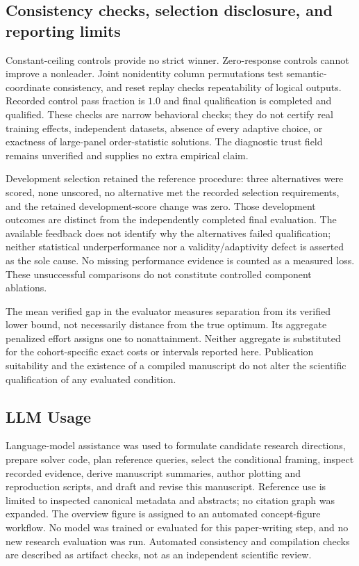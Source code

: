 \documentclass{article}
\begin{document}
\subsection{Consistency checks, selection disclosure, and reporting limits}
Constant-ceiling controls provide no strict winner. Zero-response controls cannot improve a nonleader. Joint nonidentity column permutations test semantic-coordinate consistency, and reset replay checks repeatability of logical outputs. Recorded control pass fraction is $1.0$ and final qualification is completed and qualified. These checks are narrow behavioral checks; they do not certify real training effects, independent datasets, absence of every adaptive choice, or exactness of large-panel order-statistic solutions. The diagnostic trust field remains unverified and supplies no extra empirical claim.

Development selection retained the reference procedure: three alternatives were scored, none unscored, no alternative met the recorded selection requirements, and the retained development-score change was zero. Those development outcomes are distinct from the independently completed final evaluation. The available feedback does not identify why the alternatives failed qualification; neither statistical underperformance nor a validity/adaptivity defect is asserted as the sole cause. No missing performance evidence is counted as a measured loss. These unsuccessful comparisons do not constitute controlled component ablations.

The mean verified gap in the evaluator measures separation from its verified lower bound, not necessarily distance from the true optimum. Its aggregate penalized effort assigns one to nonattainment. Neither aggregate is substituted for the cohort-specific exact costs or intervals reported here. Publication suitability and the existence of a compiled manuscript do not alter the scientific qualification of any evaluated condition.

\subsection{LLM Usage}
Language-model assistance was used to formulate candidate research directions, prepare solver code, plan reference queries, select the conditional framing, inspect recorded evidence, derive manuscript summaries, author plotting and reproduction scripts, and draft and revise this manuscript. Reference use is limited to inspected canonical metadata and abstracts; no citation graph was expanded. The overview figure is assigned to an automated concept-figure workflow. No model was trained or evaluated for this paper-writing step, and no new research evaluation was run. Automated consistency and compilation checks are described as artifact checks, not as an independent scientific review.
\end{document}
